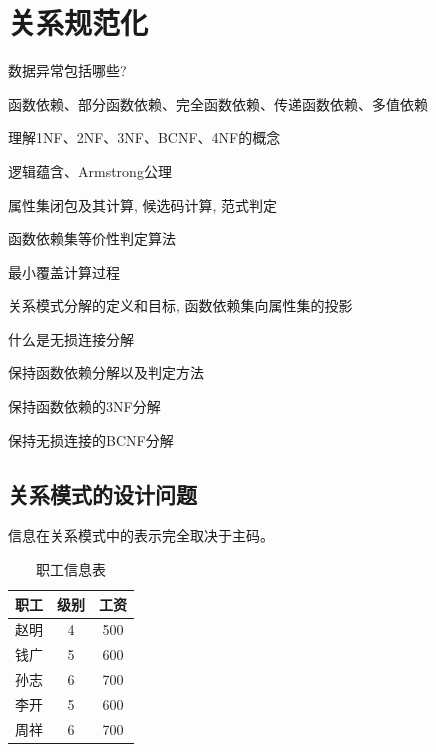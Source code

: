 \chapter{关系规范化}

\begin{introduction}[期末考试提纲]
  \item 数据异常包括哪些?
  \item 函数依赖、部分函数依赖、完全函数依赖、传递函数依赖、多值依赖
  \item 理解1NF、2NF、3NF、BCNF、4NF的概念
  \item 逻辑蕴含、Armstrong公理
  \item 属性集闭包及其计算, 候选码计算, 范式判定
  \item 函数依赖集等价性判定算法
  \item 最小覆盖计算过程
  \item 关系模式分解的定义和目标, 函数依赖集向属性集的投影
  \item 什么是无损连接分解
  \item 保持函数依赖分解以及判定方法
  \item 保持函数依赖的3NF分解
  \item 保持无损连接的BCNF分解
\end{introduction}

\section{关系模式的设计问题}

信息在关系模式中的表示完全取决于主码。

\begin{table}[H]
  \centering
  \begin{tabular}{|c|c|c|}
    \hline
    \textbf{职工} & \textbf{级别} & \textbf{工资} \\
    \hline
    赵明 & 4 & 500 \\
    \hline
    钱广 & 5 & 600 \\
    \hline
    孙志 & 6 & 700 \\
    \hline
    李开 & 5 & 600 \\
    \hline
    周祥 & 6 & 700 \\
    \hline
  \end{tabular}
  \caption{职工信息表}
\end{table}


